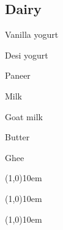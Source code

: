 \documentclass{article}
\begin{document}
\begin{multicols}{3}
      \section*{Dairy}
         \begin{shoppingList}
            \item Vanilla yogurt
            \item Desi yogurt
            \item Paneer
            \item Milk
            \item Goat milk
            \item Butter
            \item Ghee
            \item \line(1,0){10em}
            \item \line(1,0){10em}
            \item \line(1,0){10em}
         \end{shoppingList}
   \end{multicols}
\end{document}
